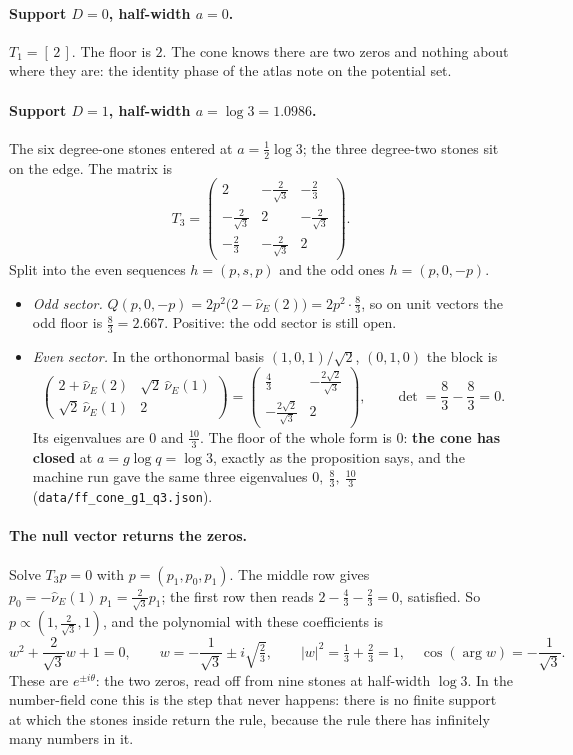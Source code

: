 \documentclass[11pt]{article}
\begin{document}
\paragraph{Support $D=0$, half-width $a=0$.} $T_1=[\,2\,]$. The floor is $2$. The cone knows there are two zeros and nothing about where they are: the identity phase of the atlas note on the potential set.

\paragraph{Support $D=1$, half-width $a=\log3=1.0986$.} The six degree-one stones entered at $a=\tfrac12\log3$; the three degree-two stones sit on the edge. The matrix is
\[
T_3=\begin{pmatrix}2&-\frac{2}{\sqrt3}&-\frac23\\[2pt]-\frac{2}{\sqrt3}&2&-\frac{2}{\sqrt3}\\[2pt]-\frac23&-\frac{2}{\sqrt3}&2\end{pmatrix}.
\]
Split into the even sequences $h=(p,s,p)$ and the odd ones $h=(p,0,-p)$.
\begin{itemize}
\item \emph{Odd sector.} $Q(p,0,-p)=2p^2\big(2-\hat\nu_E(2)\big)=2p^2\cdot\tfrac83$, so on unit vectors the odd floor is $\tfrac83=2.667$. Positive: the odd sector is still open.
\item \emph{Even sector.} In the orthonormal basis $(1,0,1)/\sqrt2$, $(0,1,0)$ the block is
\[
\begin{pmatrix}2+\hat\nu_E(2)&\sqrt2\,\hat\nu_E(1)\\ \sqrt2\,\hat\nu_E(1)&2\end{pmatrix}=\begin{pmatrix}\frac43&-\frac{2\sqrt2}{\sqrt3}\\[2pt]-\frac{2\sqrt2}{\sqrt3}&2\end{pmatrix},\qquad \det=\frac83-\frac83=0 .
\]
Its eigenvalues are $0$ and $\tfrac{10}3$. The floor of the whole form is $0$: \textbf{the cone has closed} at $a=g\log q=\log3$, exactly as the proposition says, and the machine run gave the same three eigenvalues $0,\ \tfrac83,\ \tfrac{10}3$ (\texttt{data/ff\_cone\_g1\_q3.json}).
\end{itemize}

\paragraph{The null vector returns the zeros.} Solve $T_3p=0$ with $p=(p_1,p_0,p_1)$. The middle row gives $p_0=-\hat\nu_E(1)\,p_1=\tfrac{2}{\sqrt3}p_1$; the first row then reads $2-\tfrac43-\tfrac23=0$, satisfied. So $p\propto(1,\tfrac{2}{\sqrt3},1)$, and the polynomial with these coefficients is
\[
w^2+\frac{2}{\sqrt3}w+1=0,\qquad w=-\frac{1}{\sqrt3}\pm i\sqrt{\tfrac23},\qquad |w|^2=\tfrac13+\tfrac23=1,\quad \cos(\arg w)=-\frac1{\sqrt3}.
\]
These are $e^{\pm i\theta}$: the two zeros, read off from nine stones at half-width $\log3$. In the number-field cone this is the step that never happens: there is no finite support at which the stones inside return the rule, because the rule there has infinitely many numbers in it.
\end{document}
